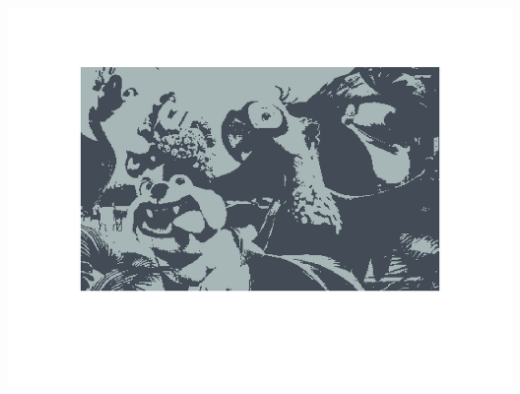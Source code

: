 \documentclass[fleqn]{article}
\begin{document}
\includegraphics[scale=0.4]{./pics/task1and2/rio_k=2_random/K=2_iteration_17_random_2_rio.png}\\
\end{document}
